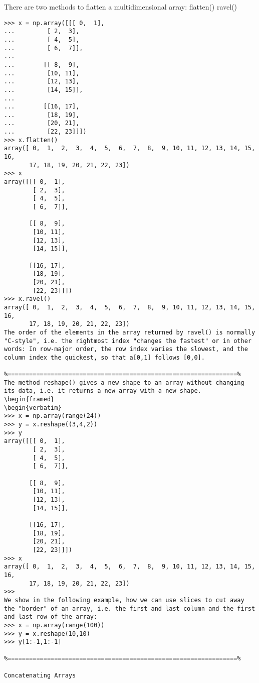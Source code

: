 There are two methods to flatten a multidimensional array:
flatten()
ravel()
\begin{framed}
\begin{verbatim}
>>> x = np.array([[[ 0,  1],
...         [ 2,  3],
...         [ 4,  5],
...         [ 6,  7]],
... 
...        [[ 8,  9],
...         [10, 11],
...         [12, 13],
...         [14, 15]],
... 
...        [[16, 17],
...         [18, 19],
...         [20, 21],
...         [22, 23]]])
>>> x.flatten()
array([ 0,  1,  2,  3,  4,  5,  6,  7,  8,  9, 10, 11, 12, 13, 14, 15, 16,
       17, 18, 19, 20, 21, 22, 23])
>>> x
array([[[ 0,  1],
        [ 2,  3],
        [ 4,  5],
        [ 6,  7]],

       [[ 8,  9],
        [10, 11],
        [12, 13],
        [14, 15]],

       [[16, 17],
        [18, 19],
        [20, 21],
        [22, 23]]])
>>> x.ravel()
array([ 0,  1,  2,  3,  4,  5,  6,  7,  8,  9, 10, 11, 12, 13, 14, 15, 16,
       17, 18, 19, 20, 21, 22, 23])
The order of the elements in the array returned by ravel() is normally "C-style", i.e. the rightmost index "changes the fastest" or in other words: In row-major order, the row index varies the slowest, and the column index the quickest, so that a[0,1] follows [0,0]. 

%================================================================%
The method reshape() gives a new shape to an array without changing its data, i.e. it returns a new array with a new shape.
\begin{framed}
\begin{verbatim}
>>> x = np.array(range(24))
>>> y = x.reshape((3,4,2))
>>> y
array([[[ 0,  1],
        [ 2,  3],
        [ 4,  5],
        [ 6,  7]],

       [[ 8,  9],
        [10, 11],
        [12, 13],
        [14, 15]],

       [[16, 17],
        [18, 19],
        [20, 21],
        [22, 23]]])
>>> x
array([ 0,  1,  2,  3,  4,  5,  6,  7,  8,  9, 10, 11, 12, 13, 14, 15, 16,
       17, 18, 19, 20, 21, 22, 23])
>>> 
We show in the following example, how we can use slices to cut away the "border" of an array, i.e. the first and last column and the first and last row of the array:
>>> x = np.array(range(100))
>>> y = x.reshape(10,10)
>>> y[1:-1,1:-1]

%================================================================%

Concatenating Arrays


\end{verbatim}
\end{framed}

